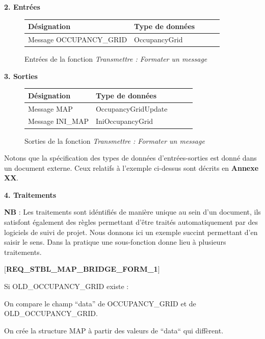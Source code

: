   \textbf{2. Entrées }
  \begin{figure}[!h]
    \begin{center}
      \begin{tabular}{|l|l|l|l|l|}
	\hline
	\textbf{Désignation} & \textbf{Type de données} \\
	\hline
	Message OCCUPANCY\_GRID & OccupancyGrid \\
	\hline
      \end{tabular}
    \end{center}
    \caption{Entrées de la fonction \emph{Transmettre : Formater un message}}
  \end{figure}
  
  \textbf{3. Sorties }
  \begin{figure}[!h]
    \begin{center}
      \begin{tabular}{|l|l|l|l|l|}
	\hline
	\textbf{Désignation} & \textbf{Type de données} \\
	\hline
	Message MAP & OccupancyGridUpdate \\
	Message INI\_MAP & IniOccupancyGrid \\
	\hline
      \end{tabular}
    \end{center}
    \caption{Sorties de la fonction \emph{Transmettre : Formater un message}}
  \end{figure}
  
  Notons que la spécification des types de données d'entrées-sorties est donné dans un document externe. Ceux relatifs à l'exemple ci-dessus sont décrits en \textbf{Annexe XX}.  
  
  \textbf{4. Traitements }
  
  \textbf{NB} : Les traitements sont idéntifiés de manière unique au sein d'un document, ils satisfont également des règles permettant d'être traités automatiquement par des logiciels de suivi de projet. 
  Nous donnons ici un exemple succint permettant d'en saisir le sens. Dans la pratique une sous-fonction donne lieu à plusieurs traitements.
  
  \textbf{$[$REQ\_STBL\_MAP\_BRIDGE\_FORM\_1$]$}
  
    \hspace{10mm} Si OLD\_OCCUPANCY\_GRID existe : 
    
    \hspace{10mm} On compare le champ ``data'' de OCCUPANCY\_GRID et de OLD\_OCCUPANCY\_GRID. 
    
    \hspace{10mm} On crée la structure MAP à partir des valeurs de ``data`` qui diffèrent. 
    
